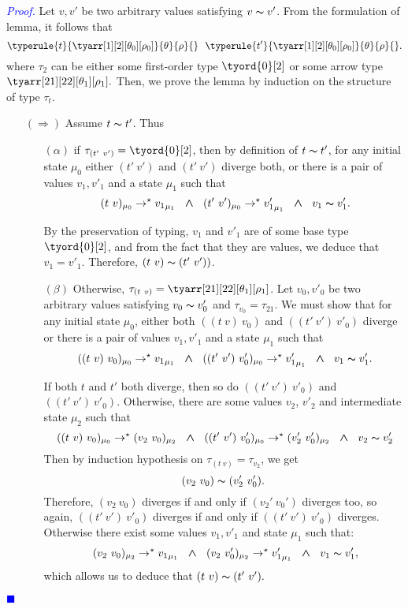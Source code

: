 \documentclass[a4paper,11pt,oneside]{article}
\theoremstyle{plain}
\renewenvironment{proof}{\noindent \begin{adjustwidth}{1.5em}{} \textcolor{blue}{\textit{Proof.}}}
{{\begin{tiny}\textcolor{blue}{$\blacksquare$}\end{tiny}}
\end{adjustwidth}~\\\noindent}
\newcommand{\tmapp}[2]{(#1 ~ #2)}
\newcommand{\ty}[1][]{\tau_{#1}}
\newcommand{\bwedge}{\boldsymbol{~\wedge~}}
\newcommand{\evalstar}[4]{~#1_{\mu_#2} \rightarrow^{\star} #3_{\mu_#4} ~}
\newcommand{\eqv}[1]{#1 \thicksim #1'}
\begin{document}
	\begin{proof}
		Let $v, v'$ be two arbitrary values satisfying $\eqv{v}$.
		From the formulation of lemma, it follows that
		$$	\typerule{t}{\tyarr[1][2][\theta_0][\rho_0]}{\theta}{\rho}{} ~~ 
				\typerule{t'}{\tyarr[1][2][\theta_0][\rho_0]}{\theta}{\rho}{}.$$
		where $\ty[2]$ can be either some first-order type $\tyord{0}[2]$ or
		some arrow type $\tyarr[21][22][\theta_1][\rho_1].$ 
		Then, we prove the lemma by induction on the structure of type $\ty[t]$.
	\begin{itemize}		
	
		\item[$(\Rightarrow)$] Assume $\eqv{t}$. Thus 		
		
		\begin{itemize}
		
		\item[$(\alpha)$] if $\ty[\tmapp{t'}{v'}] = \tyord{0}[2]$, then
		by definition of $\eqv{t}$, for any initial state $\mu_0$ either 
		$\tmapp{t'}{v'}$ and $\tmapp{t'}{v'}$ diverge both, 
		or there is a pair of values $v_1, v'_1$ and a state $\mu_1$ such that 
		$$\evalstar{\tmapp{t}{v}}{0}{{v_1}}{1} 
			\bwedge \evalstar{\tmapp{t'}{v'}}{0}{{v'_1}}{1} \bwedge~\eqv{v_1}.$$
		
		By the preservation of typing, $v_1$ and $v'_1$ are of some base 
		type $\tyord{0}[2]$, and from the fact that they are values, we deduce
		that $v_1 = v'_1$. Therefore,  $\tmapp{t}{v} \thicksim \tmapp{t'}{v'})$.
			
		\item[$(\beta)$] Otherwise, 
		$\ty[\tmapp{t}{v}] = \tyarr[21][22][\theta_1][\rho_1]$.
		Let $v_0, v'_0$ be two arbitrary values satisfying $\eqv{v_0}$ and 
		$\ty[v_0] = \ty[21]$. We must show that for any initial state $\mu_0$,
		either both 
		$\tmapp{\tmapp{t}{v}}{v_0}$ and $\tmapp{\tmapp{t'}{v'}}{v'_0}$ diverge
		or there is a pair of values $v_1, v'_1$ and a state $\mu_1$ such that 
		$$\evalstar{\tmapp{\tmapp{t}{v}}{v_0}}{0}{{v_1}}{1} \bwedge
		\evalstar{\tmapp{\tmapp{t'}{v'}}{v'_0}}{0}{{v'_1}}{1} \bwedge~\eqv{v_1}.$$
		
		If both $t$ and $t'$ both diverge,
		then so do 
		$\tmapp{\tmapp{t'}{v'}}{v'_0}$ and $\tmapp{\tmapp{t'}{v'}}{v'_0}$. 
		Otherwise, there are
		some values $v_2$, $v'_2$ and intermediate state $\mu_2$ such that
		$$\evalstar{\tmapp{\tmapp{t}{v}}{v_0}}{0}{\tmapp{v_2}{v_0}}{2} \bwedge
		\evalstar{\tmapp{\tmapp{t'}{v'}}{v'_0}}{0}{\tmapp{v'_2}{v'_0}}{2} 
		\bwedge~\eqv{v_2}$$	
		Then by induction hypothesis on $\ty[\tmapp{t}{v}]=\ty[v_2]$, we 
		get	$$ \tmapp{v_2}{v_0} \thicksim \tmapp{v'_2}{v'_0}.$$ Therefore, 
		$\tmapp{v_2}{v_0}$ diverges if and only if $\tmapp{v_2'}{v_0'}$ diverges 
		too, so again, $\tmapp{\tmapp{t'}{v'}}{v'_0}$ diverges if and only if 
		$\tmapp{\tmapp{t'}{v'}}{v'_0}$ diverges. Otherwise there exist some values $v_1, v'_1$ and state $\mu_1$ such that:
		$$\evalstar{\tmapp{v_2}{v_0}}{2}{{v_1}}{1} \bwedge
		\evalstar{\tmapp{v_2}{v'_0}}{2}{{v'_1}}{1} 
		\bwedge~\eqv{v_1},$$ which allows us to deduce that $\tmapp{t}{v} \thicksim \tmapp{t'}{v'}.$ 
		\end{itemize}
		

\end{itemize}
\end{proof}
\end{document}
